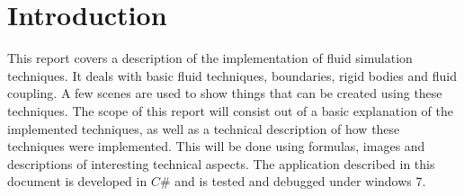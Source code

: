 \chapter{Introduction}

This report covers a description of the implementation of fluid simulation techniques. It deals with basic fluid techniques, boundaries, rigid bodies and fluid coupling. A few scenes are used to show things that can be created using these techniques. The scope of this report will consist out of a basic explanation of the implemented techniques, as well as a technical description of how these techniques were implemented. This will be done using formulas, images and descriptions of interesting technical aspects. The application described in this document is developed in $C\#$ and is tested and debugged under windows 7. 